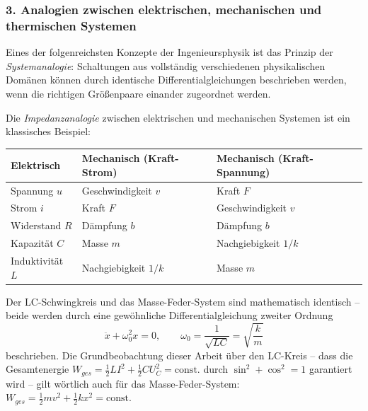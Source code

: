 ﻿\documentclass[12pt, a4paper]{article}
\begin{document}
	\subsubsection*{3. \quad Analogien zwischen elektrischen, mechanischen und thermischen Systemen}

	Eines der folgenreichsten Konzepte der Ingenieursphysik ist das Prinzip der \textit{Systemanalogie}: Schaltungen aus vollständig verschiedenen physikalischen Domänen können durch identische Differentialgleichungen beschrieben werden, wenn die richtigen Größenpaare einander zugeordnet werden.

	Die \textit{Impedanzanalogie} zwischen elektrischen und mechanischen Systemen ist ein klassisches Beispiel:
	\begin{center}
		\begin{tabular}{lll}
			\toprule
			\textbf{Elektrisch} & \textbf{Mechanisch (Kraft-Strom)} & \textbf{Mechanisch (Kraft-Spannung)} \\
			\midrule
			Spannung $u$ & Geschwindigkeit $v$ & Kraft $F$ \\
			Strom $i$ & Kraft $F$ & Geschwindigkeit $v$ \\
			Widerstand $R$ & Dämpfung $b$ & Dämpfung $b$ \\
			Kapazität $C$ & Masse $m$ & Nachgiebigkeit $1/k$ \\
			Induktivität $L$ & Nachgiebigkeit $1/k$ & Masse $m$ \\
			\bottomrule
		\end{tabular}
	\end{center}

	Der LC-Schwingkreis und das Masse-Feder-System sind mathematisch identisch -- beide werden durch eine gewöhnliche Differentialgleichung zweiter Ordnung
	\begin{equation}
		\ddot{x} + \omega_0^2 x = 0, \qquad \omega_0 = \frac{1}{\sqrt{LC}} = \sqrt{\frac{k}{m}}
	\end{equation}
	beschrieben. Die Grundbeobachtung dieser Arbeit über den LC-Kreis -- dass die Gesamtenergie $W_{ges} = \frac{1}{2}LI^2 + \frac{1}{2}CU_C^2 = \mathrm{const.}$ durch $\sin^2 + \cos^2 = 1$ garantiert wird -- gilt wörtlich auch für das Masse-Feder-System: $W_{ges} = \frac{1}{2}mv^2 + \frac{1}{2}kx^2 = \mathrm{const.}$
\end{document}
